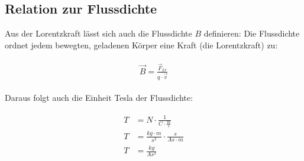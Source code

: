 \subsection{Relation zur Flussdichte}

Aus der Lorentzkraft lässt sich auch die Flussdichte $B$ definieren: Die Flussdichte ordnet jedem bewegten, geladenen Körper eine Kraft (die Lorentzkraft) zu:

\begin{align} \label{eq:Flussdichte}
\begin{split}
	\vec{B} = \frac{\vec{F}_{Lr}}{q \cdot \vec{v}}
\end{split}
\end{align}

\noindent Daraus folgt auch die Einheit Tesla der Flussdichte:

\begin{align}
\begin{split}
	T &= N \cdot \frac{1}{C \cdot \frac{m}{s}} \\
	T &= \frac{kg \cdot m}{s^2} \cdot \frac{s}{As \cdot m} \\
	T &= \frac{kg}{As^2}	
\end{split}
\end{align}





